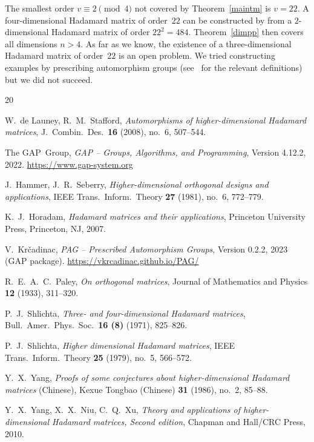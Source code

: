 \documentclass[12pt, reqno]{amsart}
\begin{document}
The smallest order $v\equiv 2 \pmod{4}$ not covered by Theorem~\ref{maintm} is $v=22$.
A four-dimensional Hadamard matrix of order~$22$ can be constructed by
\cite[Theorem~6.1.4]{YNX10} from a $2$-dimensional Hadamard matrix of order $22^2=484$.
Theorem~\ref{dimpp} then covers all dimensions $n>4$. As far as we know, the existence
of a three-dimensional Hadamard matrix of order~$22$ is an open problem. We tried
constructing examples by prescribing automorphism groups (see~\cite{dLS08}
for the relevant definitions) but we did not succeed.


\begin{thebibliography}{20}

W.~de Launey, R.~M.~Stafford, \emph{Automorphisms of higher-dimensional Hadamard matrices},
J.\ Combin.\ Des.\ \textbf{16} (2008), no.\ 6, 507--544.

The GAP~Group, \emph{GAP -- Groups, Algorithms, and Programming},
Version 4.12.2, 2022. \url{https://www.gap-system.org}

J.~Hammer, J.~R.~Seberry, \emph{Higher-dimensional orthogonal designs and applications},
IEEE Trans.\ Inform.\ Theory \textbf{27} (1981), no.\ 6, 772--779.

K.~J.~Horadam, \emph{Hadamard matrices and their applications}, Princeton University Press,
Princeton, NJ, 2007.

V.~Krčadinac, \emph{PAG -- Prescribed Automorphism Groups}, Version 0.2.2, 2023 (GAP package).
\url{https://vkrcadinac.github.io/PAG/}

R.~E.~A.~C.~Paley, \emph{On orthogonal matrices}, Journal of Mathematics and
Physics \textbf{12} (1933), 311–320.

P.~J.~Shlichta, \emph{Three- and four-dimensional Hadamard matrices},
Bull.\ Amer.\ Phys.\ Soc.\ \textbf{16 (8)} (1971), 825--826.

P.~J.~Shlichta, \emph{Higher dimensional Hadamard matrices},
IEEE Trans.\ Inform.\ Theory \textbf{25} (1979), no.\ 5, 566--572.

Y.~X.~Yang, \emph{Proofs of some conjectures about higher-dimensional Hadamard matrices} (Chinese),
Kexue Tongbao (Chinese) \textbf{31} (1986), no.\ 2, 85--88.

Y.~X.~Yang, X.~X.~Niu, C.~Q.~Xu, \emph{Theory and applications of higher-dimensional Hadamard
matrices, Second edition}, Chapman and Hall/CRC Press, 2010.

\end{thebibliography}
\end{document}
